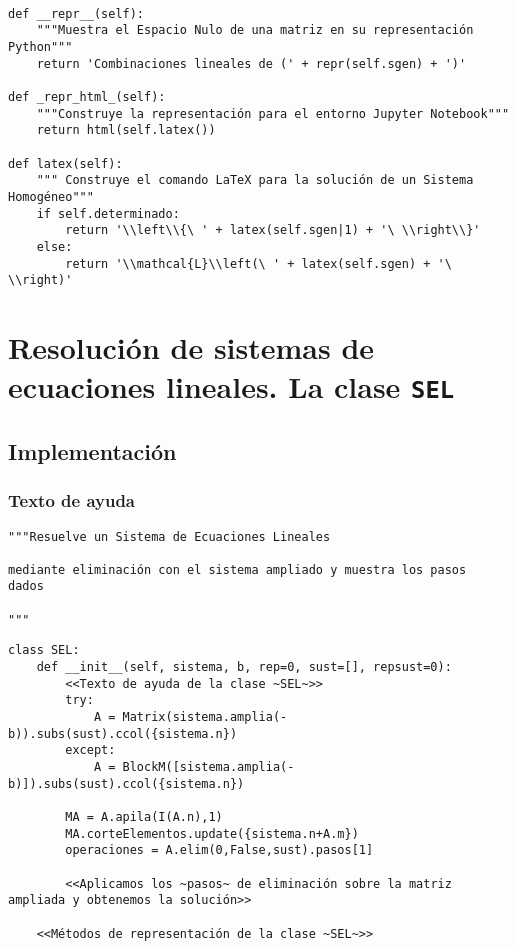 \documentclass[11pt]{report}
\begin{document}
\begin{verbatim}

def __repr__(self):
    """Muestra el Espacio Nulo de una matriz en su representación Python"""
    return 'Combinaciones lineales de (' + repr(self.sgen) + ')'

def _repr_html_(self):
    """Construye la representación para el entorno Jupyter Notebook"""
    return html(self.latex())

def latex(self):
    """ Construye el comando LaTeX para la solución de un Sistema Homogéneo"""
    if self.determinado:
        return '\\left\\{\ ' + latex(self.sgen|1) + '\ \\right\\}'
    else:
        return '\\mathcal{L}\\left(\ ' + latex(self.sgen) + '\ \\right)' 

\end{verbatim}


\chapter{Resolución de sistemas de ecuaciones lineales. La clase  \texttt{SEL}}
\label{sec:orgb03ab0f}

\section{Implementación}
\label{sec:orgada3f44}
\subsection{Texto de ayuda}
\label{sec:org7bcc207}

\begin{verbatim}
"""Resuelve un Sistema de Ecuaciones Lineales

mediante eliminación con el sistema ampliado y muestra los pasos
dados

"""
\end{verbatim}

\begin{verbatim}
class SEL:
    def __init__(self, sistema, b, rep=0, sust=[], repsust=0):
        <<Texto de ayuda de la clase ~SEL~>>
        try:
            A = Matrix(sistema.amplia(-b)).subs(sust).ccol({sistema.n})
        except:
            A = BlockM([sistema.amplia(-b)]).subs(sust).ccol({sistema.n})
            
        MA = A.apila(I(A.n),1)
        MA.corteElementos.update({sistema.n+A.m})
        operaciones = A.elim(0,False,sust).pasos[1]
        
        <<Aplicamos los ~pasos~ de eliminación sobre la matriz ampliada y obtenemos la solución>>
        
    <<Métodos de representación de la clase ~SEL~>>
    
\end{verbatim}
\end{document}
